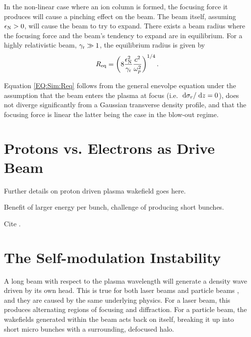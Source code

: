 In the non-linear case where an ion column is formed, the focusing force it produces will cause a pinching effect on the beam. The beam itself, assuming $\epsilon_{\mathrm{N}} > 0$, will cause the beam to try to expand. There exists a beam radius where the focusing force and the beam's tendency to expand are in equilibrium. For a highly relativistic beam, $\gamma_{\mathrm{r}} \gg 1$, the equilibrium radius is given by \cite{krall:1995}
\begin{equation}
    R_{\mathrm{eq}} = \left( 8 \frac{\epsilon_{\mathrm{N}}^2}{\gamma_{\mathrm{r}}} \frac{c^2}{\omega_{p}^2} \right)^{1/4}. \label{EQ:Sim:Req}
\end{equation}

Equation \ref{EQ:Sim:Req} follows from the general enevolpe equation \cite{lee:1976} under the assumption that the beam enters the plasma at focus (i.e. $\;\mathrm{d}\sigma_{r}/\;\mathrm{d}z = 0$), does not diverge significantly from a Gaussian transverse density profile, and that the focusing force is linear \cite{krall:1995} \dash the latter being the case in the blow-out regime.

\section{Protons vs. Electrons as Drive Beam}
\label{Int:PDPWFA}

Further details on proton driven plasma wakefield goes here.

Benefit of larger energy per bunch, challenge of producing short bunches.

Cite \cite{adli:2016a}.

\section{The Self-modulation Instability}
\label{Int:SMI}

A long beam with respect to the plasma wavelength will generate a density wave driven by its own head. This is true for both laser beams \cite{esarey:1994} and particle beams \cite{kumar:2010}, and they are caused by the same underlying physics. For a laser beam, this produces alternating regions of focusing and diffraction. For a particle beam, the wakefields generated within the beam acts back on itself, breaking it up into short micro bunches with a surrounding, defocused halo.

